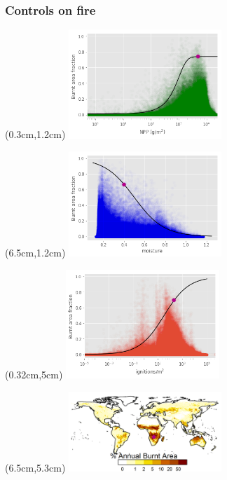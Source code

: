 \begin{frame}
	\frametitle{Controls on fire}
	\begin{textblock*}{14cm}(0.3cm,1.2cm)
		\includegraphics[width=5.78cm]{images/limitCurves/Savanna/NPPVsFire}	
	\end{textblock*}
	\begin{textblock*}{14cm}(6.5cm,1.2cm)
		\includegraphics[width=5.78cm]{images/limitCurves/Savanna/alphaVsFire}	
	\end{textblock*}
	\begin{textblock*}{14cm}(0.32cm,5cm)
		\includegraphics[width=5.78cm]{images/limitCurves/Savanna/ignitionsVsFire.png}		
	\end{textblock*}
	\begin{textblock*}{14cm}(6.5cm,5.3cm)
		\includegraphics[width=5.78cm]{images/limitCurves/Savanna/fireMap.png}		
	\end{textblock*}
\end{frame}


